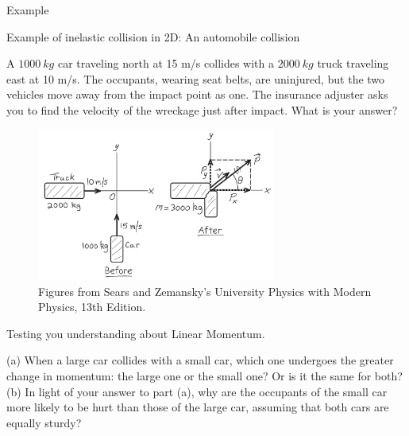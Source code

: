 \documentclass[]{beamer}
\begin{document}
\begin{frame}
    Example
    \vspace{3mm}
    
Example of inelastic collision in 2D: An automobile collision
\vspace{3mm}


A $1000~kg$ car traveling north at 15 m/s collides with a $2000~kg$
truck traveling east at 10 m/s. The occupants, wearing seat belts,
are uninjured, but the two vehicles move away from the impact
point as one. The insurance adjuster asks you to find the velocity
of the wreckage just after impact. What is your answer?

\begin{figure}[h!]  
    \includegraphics[width=0.7\textwidth]{images/7.jpg}
    \caption{ {\tiny Figures from Sears and Zemansky's University Physics 
    with Modern Physics, 13th Edition.} }
  \end{figure}

    
    
    \end{frame}


\begin{frame}

Testing you understanding about Linear Momentum.
\vspace{7mm}

(a) When a large car collides with a small car, which one undergoes
the greater change in momentum: the large one or the small
one? Or is it the same for both? (b) In light of your answer to part (a),
why are the occupants of the small car more likely to be hurt than
those of the large car, assuming that both cars are equally sturdy?

 \end{frame}
\end{document}
